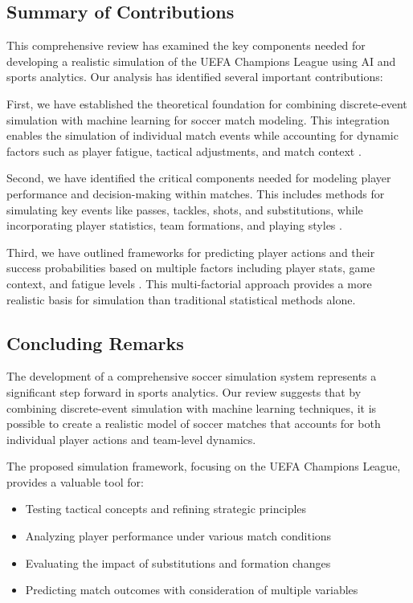 \documentclass[10pt,journal,compsoc]{IEEEtran}
\begin{document}
\subsection{Summary of Contributions}
This comprehensive review has examined the key components needed for developing a realistic simulation of the UEFA Champions League using AI and sports analytics. Our analysis has identified several important contributions:

First, we have established the theoretical foundation for combining discrete-event simulation with machine learning for soccer match modeling. This integration enables the simulation of individual match events while accounting for dynamic factors such as player fatigue, tactical adjustments, and match context \cite{pu2024orientation}.

Second, we have identified the critical components needed for modeling player performance and decision-making within matches. This includes methods for simulating key events like passes, tackles, shots, and substitutions, while incorporating player statistics, team formations, and playing styles \cite{wong2025predictive, konefal2023seven}.

Third, we have outlined frameworks for predicting player actions and their success probabilities based on multiple factors including player stats, game context, and fatigue levels \cite{dambroz2022effect}. This multi-factorial approach provides a more realistic basis for simulation than traditional statistical methods alone.

\subsection{Concluding Remarks}
The development of a comprehensive soccer simulation system represents a significant step forward in sports analytics. Our review suggests that by combining discrete-event simulation with machine learning techniques, it is possible to create a realistic model of soccer matches that accounts for both individual player actions and team-level dynamics.

The proposed simulation framework, focusing on the UEFA Champions League, provides a valuable tool for:
\begin{itemize}
    \item Testing tactical concepts and refining strategic principles
    \item Analyzing player performance under various match conditions
    \item Evaluating the impact of substitutions and formation changes
    \item Predicting match outcomes with consideration of multiple variables
\end{itemize}
\end{document}

